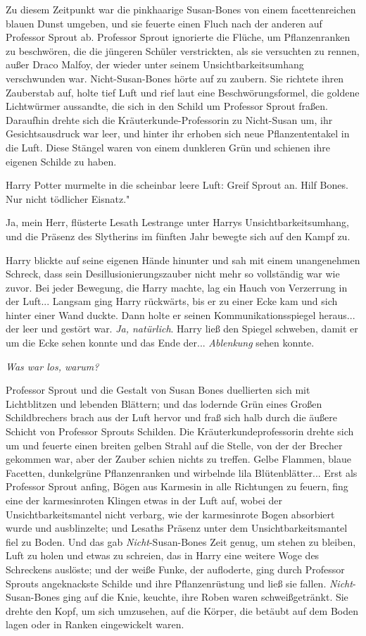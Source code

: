 Zu diesem Zeitpunkt war die pinkhaarige Susan-Bones von einem facettenreichen
blauen Dunst umgeben, und sie feuerte einen Fluch nach der anderen auf Professor
Sprout ab. Professor Sprout ignorierte die Flüche, um Pflanzenranken zu
beschwören, die die jüngeren Schüler verstrickten, als sie versuchten zu rennen,
außer Draco Malfoy, der wieder unter seinem Unsichtbarkeitsumhang verschwunden
war. Nicht-Susan-Bones hörte auf zu zaubern. Sie richtete ihren Zauberstab auf,
holte tief Luft und rief laut eine Beschwörungsformel, die goldene Lichtwürmer
aussandte, die sich in den Schild um Professor Sprout fraßen. Daraufhin drehte
sich die Kräuterkunde-Professorin zu Nicht-Susan um, ihr Gesichtsausdruck war
leer, und hinter ihr erhoben sich neue Pflanzententakel in die Luft. Diese
Stängel waren von einem dunkleren Grün und schienen ihre eigenen Schilde zu
haben.

Harry Potter murmelte in die scheinbar leere Luft: \glqq Greif Sprout an. Hilf
Bones. Nur nicht tödlicher Eisnatz."

\glqq Ja, mein Herr\grqq{}, flüsterte Lesath Lestrange unter Harrys
Unsichtbarkeitsumhang, und die Präsenz des Slytherins im fünften Jahr bewegte
sich auf den Kampf zu.

Harry blickte auf seine eigenen Hände hinunter und sah mit einem unangenehmen
Schreck, dass sein Desillusionierungszauber nicht mehr so vollständig war wie
zuvor. Bei jeder Bewegung, die Harry machte, lag ein Hauch von Verzerrung in der
Luft... Langsam ging Harry rückwärts, bis er zu einer Ecke kam und sich hinter
einer Wand duckte. Dann holte er seinen Kommunikationsspiegel heraus... der leer
und gestört war. \emph{Ja, natürlich}. Harry ließ den Spiegel schweben, damit er
um die Ecke sehen konnte und das Ende der... \emph{Ablenkung} sehen konnte.

\emph{Was war los, warum?}

Professor Sprout und die Gestalt von Susan Bones duellierten sich mit
Lichtblitzen und lebenden Blättern; und das lodernde Grün eines Großen
Schildbrechers brach aus der Luft hervor und fraß sich halb durch die äußere
Schicht von Professor Sprouts Schilden. Die Kräuterkundeprofessorin drehte sich
um und feuerte einen breiten gelben Strahl auf die Stelle, von der der Brecher
gekommen war, aber der Zauber schien nichts zu treffen. Gelbe Flammen, blaue
Facetten, dunkelgrüne Pflanzenranken und wirbelnde lila Blütenblätter... Erst
als Professor Sprout anfing, Bögen aus Karmesin in alle Richtungen zu feuern,
fing eine der karmesinroten Klingen etwas in der Luft auf, wobei der
Unsichtbarkeitsmantel nicht verbarg, wie der karmesinrote Bogen absorbiert wurde
und ausblinzelte; und Lesaths Präsenz unter dem Unsichtbarkeitsmantel fiel zu
Boden. Und das gab \emph{Nicht}-Susan-Bones Zeit genug, um stehen zu bleiben,
Luft zu holen und etwas zu schreien, das in Harry eine weitere Woge des
Schreckens auslöste; und der weiße Funke, der aufloderte, ging durch Professor
Sprouts angeknackste Schilde und ihre Pflanzenrüstung und ließ sie fallen.
\emph{Nicht}-Susan-Bones ging auf die Knie, keuchte, ihre Roben waren
schweißgetränkt. Sie drehte den Kopf, um sich umzusehen, auf die Körper, die
betäubt auf dem Boden lagen oder in Ranken eingewickelt waren.

